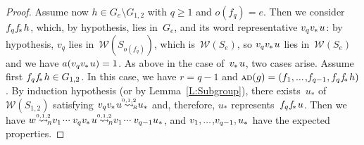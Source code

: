 \documentclass{amsart}
\numberwithin{equation}{section}
\theoremstyle{plain}
\theoremstyle{definition}
\let\ge=\geqslant
\begin{document}
\begin{proof}
Assume now ${h} \in {G}_{e} \setminus {G}_{1,2}$ with ${q} \ge 1$ and ${o({{f}_{q}})} = {e}$. Then we consider ${f}_{q} {{f}_{\hspace{-0.3ex}*\hspace{0.2ex}}} {h}$, which, by hypothesis, lies in~${G}_{e}$, and its word representative ${v}_{q} {{v}_{\hspace{-0.1ex}*\hspace{0.2ex}}} {u}$: by hypothesis, ${v}_{q}$ lies in~${\mathcal{W}({{S}_{{o({{f}_{q}})}}})}$, which is~${\mathcal{W}({{S}_{e}})}$, so ${v}_{q} {{v}_{\hspace{-0.1ex}*\hspace{0.2ex}}} {u}$ lies in~${\mathcal{W}({{S}_{e}})}$ and we have ${a({{v}_{q} {{v}_{\hspace{-0.1ex}*\hspace{0.2ex}}} {u}})} = 1$. As above in the case of~${{v}_{\hspace{-0.1ex}*\hspace{0.2ex}}} {u}$, two cases arise. Assume first ${f}_{q} {{f}_{\hspace{-0.3ex}*\hspace{0.2ex}}} {h} \in {G}_{1,2}$. In this case, we have ${r} = {q} - 1$ and ${{\scriptstyle\mathrm{A\hspace{-0.1ex}D}}({g})} = ({f}_1 {, ...\hspace{0.2ex},} {f}_{{q}-1}, {f}_{q} {{f}_{\hspace{-0.3ex}*\hspace{0.2ex}}} {h})$. By induction hypothesis (or by Lemma~\ref{L:Subgroup}), there exists~${u}_*$ of~${\mathcal{W}({{S}_{1,2}})}$ satisfying ${v}_{q} {{v}_{\hspace{-0.1ex}*\hspace{0.2ex}}} {u} {\mathrel{{\mathrel{\overset{\scriptscriptstyle 0,1,2}{\rightsquigarrow}}}_{\hspace{-0.9ex}{\scriptscriptstyle R}}}} {u}_*$ and, therefore, ${u}_*$ represents~${f}_{q} {{f}_{\hspace{-0.3ex}*\hspace{0.2ex}}} {u}$. Then we have ${w} {\mathrel{{\mathrel{\overset{\scriptscriptstyle 0,1,2}{\rightsquigarrow}}}_{\hspace{-0.9ex}{\scriptscriptstyle R}}}} {v}_1 {\hspace{0.2ex}{\cdot}{\cdot}{\cdot}\hspace{0.5ex}} {v}_{q} {{v}_{\hspace{-0.1ex}*\hspace{0.2ex}}} {u} {\mathrel{{\mathrel{\overset{\scriptscriptstyle 0,1,2}{\rightsquigarrow}}}_{\hspace{-0.9ex}{\scriptscriptstyle R}}}} {v}_1 {\hspace{0.2ex}{\cdot}{\cdot}{\cdot}\hspace{0.5ex}} {v}_{{q}-1} {u}_*$, and ${v}_1 {, ...\hspace{0.2ex},} {v}_{{q}-1}, {u}_*$ have the expected properties.


\end{proof}
\end{document}
